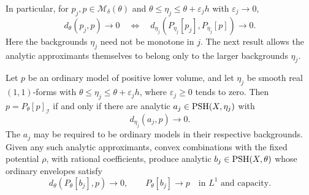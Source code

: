 In particular, for $p_j,p\in\mathcal M_\delta(\theta)$ and $\theta\leq\eta_j\leq\theta+\varepsilon_jh$ with $\varepsilon_j\to0$,
\[
 d_\theta(p_j,p)\longrightarrow0
 \quad\Longleftrightarrow\quad
 d_{\eta_j}(P_{\eta_j}[p_j],P_{\eta_j}[p])\longrightarrow0.
\]
Here the backgrounds $\eta_j$ need not be monotone in $j$. The next result allows the analytic approximants themselves to belong only to the larger backgrounds $\eta_j$.

\begin{theorem}\label{thm:analytic-approximation-curvature-error}
Let $p$ be an ordinary model of positive lower volume, and let $\eta_j$ be smooth real $(1,1)$-forms with $\theta\leq\eta_j\leq\theta+\varepsilon_jh$, where $\varepsilon_j\geq0$ tends to zero. Then $p=P_\theta[p]_{\mathcal I}$ if and only if there are analytic $a_j\in\mathrm{PSH}(X,\eta_j)$ with
\[
 d_{\eta_j}(a_j,p)\longrightarrow0.
\]
The $a_j$ may be required to be ordinary models in their respective backgrounds. Given any such analytic approximants, convex combinations with the fixed potential $\rho$, with rational coefficients, produce analytic $b_j\in\mathrm{PSH}(X,\theta)$ whose ordinary envelopes satisfy
\[
 d_\theta(P_\theta[b_j],p)\longrightarrow0,
 \qquad P_\theta[b_j]\longrightarrow p
       \quad\text{in }L^1\text{ and capacity}.
\]
\end{theorem}
